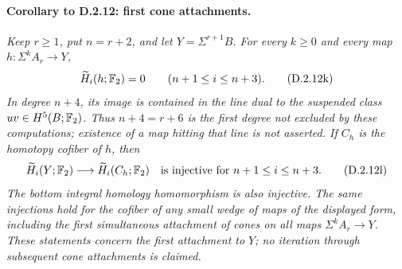 \paragraph*{Corollary to D.2.12: first cone attachments.}
\begingroup\itshape
Keep $r\geq1$, put $n=r+2$, and let $Y=\Sigma^{r+1}B$.
For every $k\geq0$ and every map $h:\Sigma^kA_r\to Y$,
\[
 \widetilde H_i(h;\mathbb F_2)=0
 \qquad(n+1\leq i\leq n+3).
 \tag{D.2.12k}
\]
In degree $n+4$, its image is contained in the line dual to
the suspended class $uv\in H^5(B;\mathbb F_2)$.
Thus $n+4=r+6$ is the first degree not excluded by these
computations; existence of a map hitting that line is not asserted.
If $C_h$ is the homotopy cofiber of $h$, then
\[
 \widetilde H_i(Y;\mathbb F_2)\longrightarrow
 \widetilde H_i(C_h;\mathbb F_2)
 \quad\hbox{is injective for }n+1\leq i\leq n+3.
 \tag{D.2.12l}
\]
The bottom integral homology homomorphism is also injective.
The same injections hold for the cofiber of any small wedge
of maps of the displayed form, including the first simultaneous
attachment of cones on all maps $\Sigma^kA_r\to Y$.
These statements concern the first attachment to $Y$; no
iteration through subsequent cone attachments is claimed.
\par\endgroup
